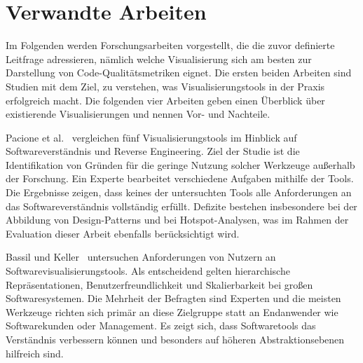 \chapter{Verwandte Arbeiten} \label{sec:VerwandteArbeiten}

Im Folgenden werden Forschungsarbeiten vorgestellt, die die zuvor definierte Leitfrage adressieren, nämlich welche Visualisierung sich am besten zur Darstellung von Code-Qualitätsmetriken eignet. Die ersten beiden Arbeiten sind Studien mit dem Ziel, zu verstehen, was Visualisierungstools in der Praxis erfolgreich macht. Die folgenden vier Arbeiten geben einen Überblick über existierende Visualisierungen und nennen Vor- und Nachteile.

\bigskip
Pacione et al.~\cite{pacione2003comparative} vergleichen fünf Visualisierungstools im Hinblick auf Softwareverständnis und Reverse Engineering. Ziel der Studie ist die Identifikation von Gründen für die geringe Nutzung solcher Werkzeuge außerhalb der Forschung. Ein Experte bearbeitet verschiedene Aufgaben mithilfe der Tools. Die Ergebnisse zeigen, dass keines der untersuchten Tools alle Anforderungen an das Softwareverständnis vollständig erfüllt. Defizite bestehen insbesondere bei der Abbildung von Design-Patterns und bei Hotspot-Analysen, was im Rahmen der Evaluation dieser Arbeit ebenfalls berücksichtigt wird.
\smallskip

Bassil und Keller~\cite{bassil2001software} untersuchen Anforderungen von Nutzern an Softwarevisualisierungstools. Als entscheidend gelten hierarchische Repräsentationen, Benutzerfreundlichkeit und Skalierbarkeit bei großen Softwaresystemen. Die Mehrheit der Befragten sind Experten und die meisten Werkzeuge richten sich primär an diese Zielgruppe statt an Endanwender wie Softwarekunden oder Management. Es zeigt sich, dass Softwaretools das Verständnis verbessern können und besonders auf höheren Abstraktionsebenen hilfreich sind.

\bigskip

